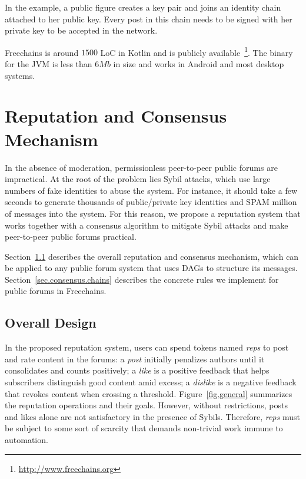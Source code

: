 \documentclass[10pt,journal,compsoc]{IEEEtran}
\newcommand{\FC}       {Freechains\xspace}
\newcommand{\reps}     {\emph{reps}\xspace}
\begin{document}
In the example, a public figure creates a key pair and joins an identity chain
attached to her public key.
Every post in this chain needs to be signed with her private key to be accepted
in the network.

\FC is around $1500$ LoC in Kotlin and is publicly
available~\footnote{\url{http://www.freechains.org}}.
The binary for the JVM is less than $6Mb$ in size and works in Android and most
desktop systems.

\section{Reputation and Consensus Mechanism}
\label{sec.consensus}

In the absence of moderation, permissionless peer-to-peer public forums are
impractical.
At the root of the problem lies Sybil attacks, which use large numbers of fake
identities to abuse the system.
For instance, it should take a few seconds to generate thousands of
public/private key identities and SPAM million of messages into the system.
For this reason, we propose a reputation system that works together with a
consensus algorithm to mitigate Sybil attacks and make peer-to-peer public
forums practical.

Section~\ref{sec.consensus.design} describes the overall reputation and
consensus mechanism, which can be applied to any public forum system that uses
DAGs to structure its messages.
Section~\ref{sec.consensus.chains} describes the concrete rules we implement
for public forums in \FC.

\subsection{Overall Design}
\label{sec.consensus.design}

In the proposed reputation system, users can spend tokens named \reps to post
and rate content in the forums:
a \emph{post} initially penalizes authors until it consolidates and counts
positively;
a \emph{like} is a positive feedback that helps subscribers distinguish good
content amid excess;
a \emph{dislike} is a negative feedback that revokes content when crossing a
threshold.
Figure~\ref{fig.general} summarizes the reputation operations and their goals.
%
However, without restrictions, posts and likes alone are not satisfactory in
the presence of Sybils.
Therefore, \reps must be subject to some sort of scarcity that demands
non-trivial work immune to automation.
\end{document}
